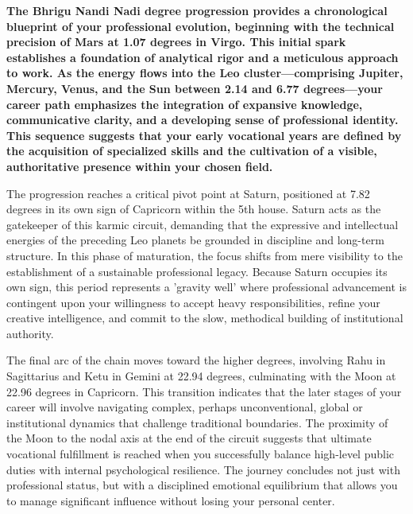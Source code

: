 {\fontsize{9.5}{13.8}\selectfont\bfseries\color{DeepSlate} The Bhrigu Nandi Nadi degree progression provides a chronological blueprint of your professional evolution, beginning with the technical precision of Mars at 1.07 degrees in Virgo. This initial spark establishes a foundation of analytical rigor and a meticulous approach to work. As the energy flows into the Leo cluster---comprising Jupiter, Mercury, Venus, and the Sun between 2.14 and 6.77 degrees---your career path emphasizes the integration of expansive knowledge, communicative clarity, and a developing sense of professional identity. This sequence suggests that your early vocational years are defined by the acquisition of specialized skills and the cultivation of a visible, authoritative presence within your chosen field.}\par\vspace{2mm}

{\fontsize{9}{13}\selectfont The progression reaches a critical pivot point at Saturn, positioned at 7.82 degrees in its own sign of Capricorn within the 5th house. Saturn acts as the gatekeeper of this karmic circuit, demanding that the expressive and intellectual energies of the preceding Leo planets be grounded in discipline and long-term structure. In this phase of maturation, the focus shifts from mere visibility to the establishment of a sustainable professional legacy. Because Saturn occupies its own sign, this period represents a 'gravity well' where professional advancement is contingent upon your willingness to accept heavy responsibilities, refine your creative intelligence, and commit to the slow, methodical building of institutional authority.}\par\vspace{1.8mm}

{\fontsize{9}{13}\selectfont The final arc of the chain moves toward the higher degrees, involving Rahu in Sagittarius and Ketu in Gemini at 22.94 degrees, culminating with the Moon at 22.96 degrees in Capricorn. This transition indicates that the later stages of your career will involve navigating complex, perhaps unconventional, global or institutional dynamics that challenge traditional boundaries. The proximity of the Moon to the nodal axis at the end of the circuit suggests that ultimate vocational fulfillment is reached when you successfully balance high-level public duties with internal psychological resilience. The journey concludes not just with professional status, but with a disciplined emotional equilibrium that allows you to manage significant influence without losing your personal center.}\par\vspace{1.8mm}

